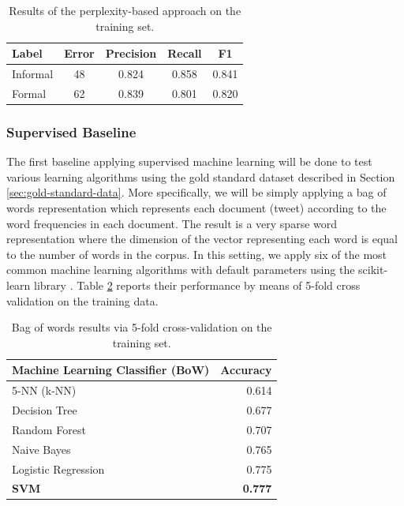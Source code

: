 \documentclass[information,article,submit,moreauthors,pdftex,10pt,a4paper]{Definitions/mdpi}
\begin{document}
\begin{table}[H]
  \centering
  \begin{tabular}{lcccc} \hline
    Label & Error & Precision & Recall & F1 \\ \hline \hline
    Informal & 48 & 0.824  & 0.858  & 0.841 \\
    Formal & 62 & 0.839 & 0.801 & 0.820 \\ \hline
  \end{tabular}
  \caption{Results of the perplexity-based approach on the training set.}
  \label{tab:perplexitytrain}
\end{table}

\subsubsection{Supervised Baseline}\label{sec:sparse-word-repr}

The first baseline applying supervised machine learning will be done to test various learning algorithms using the gold standard dataset described in Section \ref{sec:gold-standard-data}. More specifically, we will be simply applying a bag of words representation which represents each document (tweet) according to the word frequencies in each document. The result is a very sparse word representation where the dimension of the vector representing each word is equal to the number of words in the corpus. In this setting, we apply six of the most common machine learning algorithms with default parameters using the scikit-learn library \cite{pedregosa2011scikit}. Table \ref{tab:acc-ml} reports their performance by means of 5-fold cross validation on the training data.

\begin{table}[H]
  \centering
  \begin{tabular}{lr} \hline
    Machine Learning Classifier (BoW) & Accuracy \\ \hline \hline
    5-NN (k-NN) &  0.614 \\
    Decision Tree &  0.677 \\
    Random Forest &  0.707 \\
    Naive Bayes & 0.765 \\
    Logistic Regression & 0.775 \\
    \textbf{SVM} & \textbf{0.777} \\ \hline
  \end{tabular}
  \caption{Bag of words results via 5-fold cross-validation on the training set.}
  \label{tab:acc-ml}
\end{table}
\end{document}
